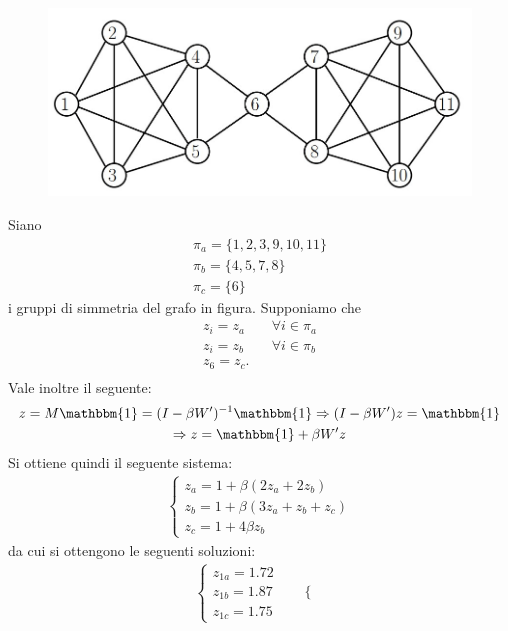 \documentclass[11pt,largemargins]{homework}
\begin{document}
\begin{alphaparts}
  \questionpart
  \begin{figure}[htb]\centering
    \includegraphics[scale=0.40]{Grafo.jpg}
      \end{figure}
  Siano
  \begin{gather*}
    \pi_a = \{1 , 2, 3, 9, 10, 11\}\\
    \pi_b = \{4, 5, 7, 8\}\\
    \pi_c = \{6\}
  \end{gather*}
  i gruppi di simmetria del grafo in figura. Supponiamo che
  \begin{align*}
    z_i = z_a && \forall i \in \pi_a \\
    z_i = z_b && \forall i \in \pi_b \\
    z_6 = z_c.\\
  \end{align*}
  Vale inoltre il seguente:
  \begin{gather*}
    z = M\mathbbm{1} = (I-\beta W')^{-1}\mathbbm{1} \Rightarrow (I-\beta W')z = \mathbbm{1} \\
    \Rightarrow z = \mathbbm{1} + \beta W' z
  \end{gather*}
  Si ottiene quindi il seguente sistema:
  \begin{gather*}
    \begin{cases}
      z_a = 1 + \beta (2z_a + 2z_b)\\
      z_b = 1+ \beta (3z_a + z_b + z_c)\\
      z_c = 1+ 4\beta z_b
    \end{cases}
  \end{gather*}
  da cui si ottengono le seguenti soluzioni:
  \begin{align*}
    \begin{cases}
      z_{1a} = 1.72 \\
      z_{1b}= 1.87 \\
      z_{1c} = 1.75
    \end{cases} && \begin{cases}

\end{cases}
\end{align*}
\end{alphaparts}
\end{document}
